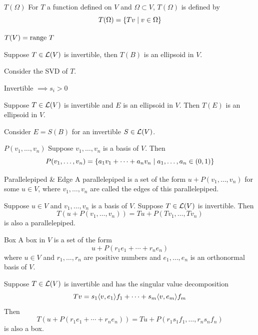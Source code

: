 \documentclass[12pt,a4paper]{article}
\begin{document}
    \begin{notation}{$T(\Omega)$}
        For $T$ a function defined on $V$ and $\Omega\subset V$, $T(\Omega)$ is defined by
        $$
        T(\Omega)=\left\{Tv\mid v\in\Omega\right\}
        $$
    \end{notation}
    \begin{remark}
        $T(V)=\operatorname{range\,} T$
    \end{remark}
    \hfill

    \begin{prop}
        Suppose $T\in\mathcal{L}(V)$ is invertible, then $T(B)$ is an ellipsoid in $V$.
    \end{prop}
    \begin{remark}
        Consider the SVD of $T$.
    \end{remark}
    \begin{remark}
        Invertible $\implies s_i>0$
    \end{remark}
    \hfill

    \begin{prop}
        Suppose $T\in\mathcal{L}(V)$ is invertible and $E$ is an ellipsoid in $V$. Then $T(E)$ is an ellipsoid in $V$.
    \end{prop}
    \begin{remark}
        Consider $E=S(B)$ for an invertible $S\in\mathcal{L}(V)$.
    \end{remark}
    \hfill

    \begin{notation}{$P(v_1,\dots,v_n)$}
        Suppose $v_1,\dots,v_n$ is a basis of $V$. Then
        $$
        P(v_1,\dots,v_n)=\left\{a_1v_1+\cdots+a_nv_n\mid a_1,\dots,a_n\in(0,1)\right\}
        $$
    \end{notation}
    \begin{defi}{Parallelepiped \& Edge}
        A parallelepiped is a set of the form $u+P(v_1,\dots,v_n)$ for some $u\in V$, where $v_1,\dots,v_n$ are called the edges of this parallelepiped.
    \end{defi}
    \hfill

    \begin{prop}
        Suppose $u\in V$ and $v_1,\dots,v_n$ is a basis of $V$. Suppose $T\in\mathcal{L}(V)$ is invertible. Then
        $$
        T(u+P(v_1,\dots,v_n))=Tu+P(Tv_1,\dots,Tv_n)
        $$
        is also a parallelepiped.
    \end{prop}
    \hfill

    \begin{defi}{Box}
        A box in $V$ is a set of the form 
        $$
        u+P(r_1e_1+\cdots+r_ne_n)
        $$
        where $u\in V$ and $r_1,\dots,r_n$ are positive numbers and $e_1,\dots,e_n$ is an orthonormal basis of $V$.
    \end{defi}
    \begin{prop}
        Suppose $T\in\mathcal{L}(V)$ is invertible and has the singular value decomposition
        $$
        Tv=s_1\langle v,e_1\rangle f_1+\cdots+s_m\langle v,e_m\rangle f_m
        $$
        Then
        $$
        T(u+P(r_1e_1+\cdots+r_ne_n))=Tu+P(r_1s_1f_1,\dots,r_ns_nf_n)
        $$
        is also a box.
    \end{prop}
    \hfill
	
\end{document}
